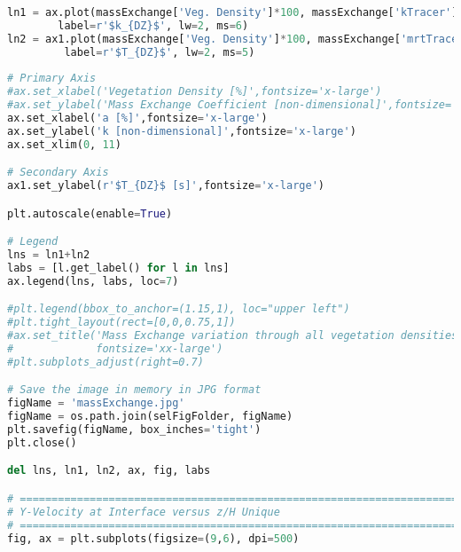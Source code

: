 \begin{lstlisting}[language=python]
ln1 = ax.plot(massExchange['Veg. Density']*100, massExchange['kTracer'], 'ko-',
        label=r'$k_{DZ}$', lw=2, ms=6)
ln2 = ax1.plot(massExchange['Veg. Density']*100, massExchange['mrtTracer'], 'ks--', 
         label=r'$T_{DZ}$', lw=2, ms=5)
    
# Primary Axis
#ax.set_xlabel('Vegetation Density [%]',fontsize='x-large')
#ax.set_ylabel('Mass Exchange Coefficient [non-dimensional]',fontsize='x-large')
ax.set_xlabel('a [%]',fontsize='x-large')
ax.set_ylabel('k [non-dimensional]',fontsize='x-large')
ax.set_xlim(0, 11)

# Secondary Axis
ax1.set_ylabel(r'$T_{DZ}$ [s]',fontsize='x-large')

plt.autoscale(enable=True)

# Legend
lns = ln1+ln2
labs = [l.get_label() for l in lns]
ax.legend(lns, labs, loc=7)

#plt.legend(bbox_to_anchor=(1.15,1), loc="upper left")
#plt.tight_layout(rect=[0,0,0.75,1])
#ax.set_title('Mass Exchange variation through all vegetation densities',
#             fontsize='xx-large')
#plt.subplots_adjust(right=0.7)

# Save the image in memory in JPG format
figName = 'massExchange.jpg'
figName = os.path.join(selFigFolder, figName)
plt.savefig(figName, box_inches='tight')
plt.close()

del lns, ln1, ln2, ax, fig, labs

# =============================================================================
# Y-Velocity at Interface versus z/H Unique
# =============================================================================
fig, ax = plt.subplots(figsize=(9,6), dpi=500)


\end{lstlisting}
